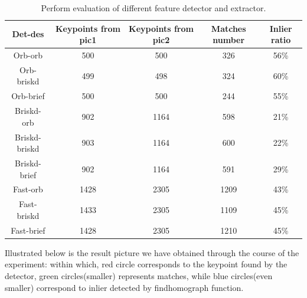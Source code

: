 \documentclass[10pt,conference,compsocconf]{IEEEtran}
\newcommand\tabhead[1]{\small\textbf{#1}}
\begin{document}
\begin{table}[!ht]
  \centering
  \begin{tabular}{|c|c|c|c|c|}
    \hline
    \tabhead{Det-des}&
    \multicolumn{1}{|p{0.15\columnwidth}|}{\centering\tabhead{Keypoints from pic1}} &
    \multicolumn{1}{|p{0.15\columnwidth}|}{\centering\tabhead{Keypoints from pic2}}&
    \multicolumn{1}{|p{0.15\columnwidth}|}{\centering\tabhead{Matches number}}&
    \multicolumn{1}{|p{0.1\columnwidth}|}{\centering\tabhead{Inlier ratio}} \\
    \hline
    Orb-orb & 500 & 500 & 326 & 56\%\\
    \hline
    Orb-briskd & 499 & 498 & 324 & 60\%\\
    \hline
    Orb-brief & 500 & 500 & 244 &	55\%\\
    \hline
    Briskd-orb &	902 &	1164 &	598 &	21\%\\
    \hline
    Briskd-briskd &	903 &	1164 &	600 &	22\%\\
    \hline
    Briskd-brief &	902 &	1164 &	591 &	29\%\\
    \hline
    Fast-orb &	1428 &	2305 &	1209 &	43\%\\
    \hline
    Fast-briskd &	1433 &	2305	 &1109 &	45\%\\
    \hline
    Fast-brief &	1428 &	2305 &	1210 &	45\%\\
    \hline
  \end{tabular}
  \caption{Perform evaluation of different feature detector and extractor.}
  \label{tab:table1}
\end{table}

Illustrated below is the result picture we have obtained through the course of the experiment: within which, red circle corresponds to the keypoint found by the detector, green circles(smaller) represents matches, while blue circles(even smaller) correspond to inlier detected by findhomograph function.\\
\end{document}
